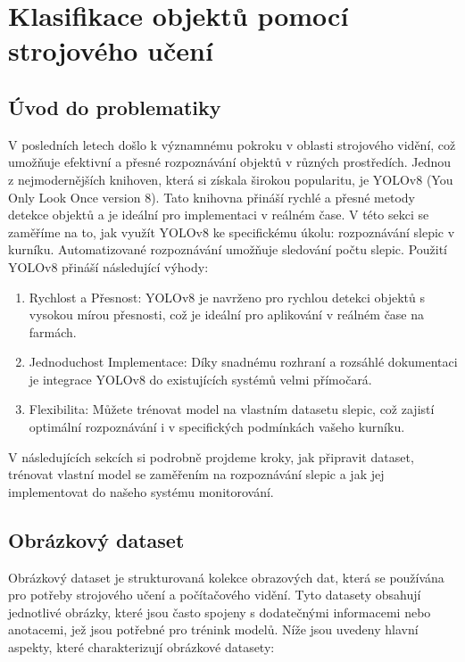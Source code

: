 \section{Klasifikace objektů pomocí strojového učení}\label{sec:klasifikace-objektu-pomoci-strojoveho-uceni}

\subsection{Úvod do problematiky}\label{subsec:uvod-do-problematiky}
V posledních letech došlo k významnému pokroku v oblasti strojového vidění, což umožňuje efektivní a přesné rozpoznávání objektů v různých prostředích.
Jednou z nejmodernějších knihoven, která si získala širokou popularitu, je YOLOv8 (You Only Look Once version 8).
Tato knihovna přináší rychlé a přesné metody detekce objektů a je ideální pro implementaci v reálném čase.
V této sekci se zaměříme na to, jak využít YOLOv8 ke specifickému úkolu: rozpoznávání slepic v kurníku.
Automatizované rozpoznávání umožňuje sledování počtu slepic.
Použití YOLOv8 přináší následující výhody:

\begin{enumerate}
    \item Rychlost a Přesnost: YOLOv8 je navrženo pro rychlou detekci objektů s vysokou mírou přesnosti, což je ideální pro aplikování v reálném čase na farmách.
    \item Jednoduchost Implementace: Díky snadnému rozhraní a rozsáhlé dokumentaci je integrace YOLOv8 do existujících systémů velmi přímočará.
    \item Flexibilita: Můžete trénovat model na vlastním datasetu slepic, což zajistí optimální rozpoznávání i v specifických podmínkách vašeho kurníku.
\end{enumerate}
V následujících sekcích si podrobně projdeme kroky, jak připravit dataset, trénovat vlastní model se zaměřením na rozpoznávání slepic a jak jej implementovat do našeho systému monitorování.

\subsection{Obrázkový dataset}\label{subsec:obrazkovy-dataset}

Obrázkový dataset je strukturovaná kolekce obrazových dat, která se používána pro potřeby strojového učení a počítačového vidění.
Tyto datasety obsahují jednotlivé obrázky, které jsou často spojeny s dodatečnými informacemi nebo anotacemi, jež jsou potřebné pro trénink modelů.
Níže jsou uvedeny hlavní aspekty, které charakterizují obrázkové datasety:

